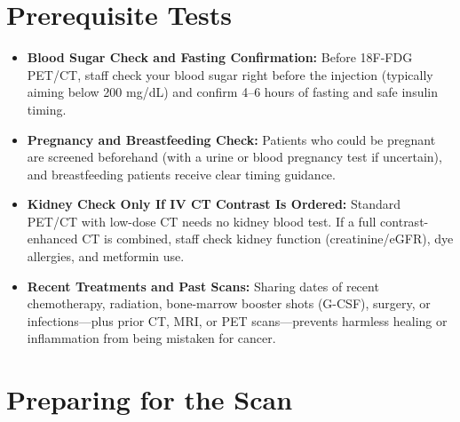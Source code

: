 \section{Prerequisite Tests}

\begin{itemize}
    \item \textbf{Blood Sugar Check and Fasting Confirmation:} Before 18F-FDG PET/CT, staff check your blood sugar right before the injection (typically aiming below 200 mg/dL) and confirm 4--6 hours of fasting and safe insulin timing.
    \item \textbf{Pregnancy and Breastfeeding Check:} Patients who could be pregnant are screened beforehand (with a urine or blood pregnancy test if uncertain), and breastfeeding patients receive clear timing guidance.
    \item \textbf{Kidney Check Only If IV CT Contrast Is Ordered:} Standard PET/CT with low-dose CT needs no kidney blood test. If a full contrast-enhanced CT is combined, staff check kidney function (creatinine/eGFR), dye allergies, and metformin use.
    \item \textbf{Recent Treatments and Past Scans:} Sharing dates of recent chemotherapy, radiation, bone-marrow booster shots (G-CSF), surgery, or infections---plus prior CT, MRI, or PET scans---prevents harmless healing or inflammation from being mistaken for cancer.
\end{itemize}

\section{Preparing for the Scan}

